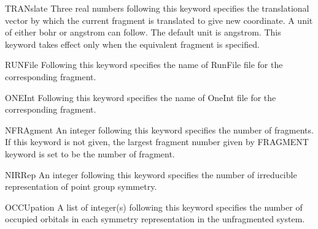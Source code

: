\begin{keywordlist}
\item[TRANslate]
Three real numbers following this keyword specifies the translational
vector by which the current fragment is translated to give new coordinate.
A unit of either bohr or angstrom can follow.  The default unit is angstrom.
This keyword takes effect only when the equivalent fragment is specified.
\item[RUNFile]
Following this keyword specifies the name of RunFile file for the
corresponding fragment.
\item[ONEInt]
Following this keyword specifies the name of OneInt file for the
corresponding fragment.
\item[NFRAgment]
An integer following this keyword specifies the number of fragments.
If this keyword is not given, the largest fragment number given by
FRAGMENT keyword is set to be the number of fragment.
\item[NIRRep]
An integer following this keyword specifies the number of irreducible
representation of point group symmetry.
\item[OCCUpation]
A list of integer(s) following this keyword specifies the number of
occupied orbitals in each symmetry representation in the unfragmented
system.

\end{keywordlist}
